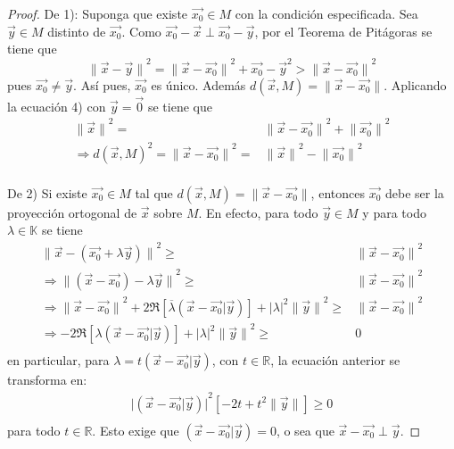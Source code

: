 \documentclass[12pt]{report}
\newcounter{it}
\theoremstyle{largebreak}
\newcommand\abs[1]{\ensuremath{\big|#1\big|}}
\newcommand\norm[1]{\ensuremath{\|#1\|}}
\newcommand\pint[2]{\ensuremath{\left(#1\big| #2\right)}}
\newcommand\conj[1]{\ensuremath{\overline{#1}}}
\begin{document}
    \begin{proof}
        De 1): Suponga que existe $\vec{x_0}\in M$ con la condición especificada. Sea $\vec{y}\in M$ distinto de $\vec{x_0}$. Como $\vec{x_0}-\vec{x}\perp\vec{x_0}-\vec{y}$, por el Teorema de Pitágoras se tiene que
        \begin{equation}
            \norm{\vec{x}-\vec{y}}^2=\norm{\vec{x}-\vec{x_0}}^2+\vec{x_0}-\vec{y}^2>\norm{\vec{x}-\vec{x_0}}^2
        \end{equation}
        pues $\vec{x_0}\neq \vec{y}$. Así pues, $\vec{x_0}$ es único. Además $d(\vec{x},M)=\norm{\vec{x}-\vec{x_0}}$. Aplicando la ecuación 4) con $\vec{y}=\vec{0}$ se tiene que
        \begin{equation*}
            \begin{split}
                \norm{\vec{x}}^2=&\norm{\vec{x}-\vec{x_0}}^2+\norm{\vec{x_0}}^2\\
                \Rightarrow d(\vec{x},M)^2=\norm{\vec{x}-\vec{x_0}}^2=&\norm{\vec{x}}^2-\norm{\vec{x_0}}^2\\
            \end{split}
        \end{equation*}
        
        De 2) Si existe $\vec{x_0}\in M$ tal que $d(\vec{x},M)=\norm{\vec{x}-\vec{x_0}}$, entonces $\vec{x_0}$ debe ser la proyección ortogonal de $\vec{x}$ sobre $M$. En efecto, para todo $\vec{y}\in M$ y para todo $\lambda\in\mathbb{K}$ se tiene
        \begin{equation}
            \begin{split}
                \norm{\vec{x}-(\vec{x_0}+\lambda\vec{y})}^2\geq&\norm{\vec{x}-\vec{x_0}}^2\\
                \Rightarrow \norm{(\vec{x}-\vec{x_0})-\lambda\vec{y}}^2\geq&\norm{\vec{x}-\vec{x_0}}^2\\
                \Rightarrow \norm{\vec{x}-\vec{x_0}}^2+2\Re[\conj{\lambda} \pint{\vec{x}-\vec{x_0}}{\vec{y}}]+\abs{\lambda}^2\norm{\vec{y}}^2\geq&\norm{\vec{x}-\vec{x_0}}^2\\
                \Rightarrow -2\Re[\lambda\pint{\vec{x}-\vec{x_0}}{\vec{y}}]+\abs{\lambda}^2\norm{\vec{y}}^2\geq& 0\\
            \end{split}
        \end{equation}
        en particular, para $\lambda=t\pint{\vec{x}-\vec{x_0}}{\vec{y}}$, con $t\in\mathbb{R}$, la ecuación anterior se transforma en:
        \begin{equation*}
            \begin{split}
                \abs{\pint{\vec{x}-\vec{x_0}}{\vec{y}}}^2\left[-2t+t^2\norm{\vec{y}}\right]\geq0 \\
            \end{split}
        \end{equation*}
        para todo $t\in\mathbb{R}$. Esto exige que $\pint{\vec{x}-\vec{x_0}}{\vec{y}}=0$, o sea que $\vec{x}-\vec{x_0}\perp \vec{y}$.
    \end{proof}
\end{document}
